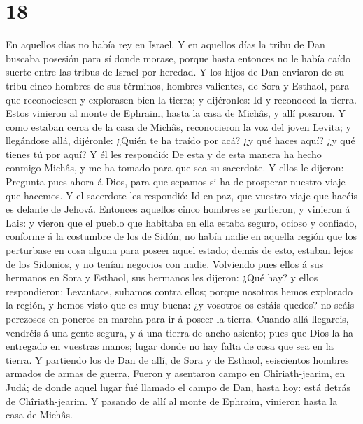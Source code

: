\hypertarget{section-17}{%
\section{18}\label{section-17}}

 En aquellos días no había rey en Israel. Y en aquellos
días la tribu de Dan buscaba posesión para sí donde morase, porque hasta
entonces no le había caído suerte entre las tribus de Israel por
heredad.  Y los hijos de Dan enviaron de su tribu cinco
hombres de sus términos, hombres valientes, de Sora y Esthaol, para que
reconociesen y explorasen bien la tierra; y dijéronles: Id y reconoced
la tierra. Estos vinieron al monte de Ephraim, hasta la casa de Michâs,
y allí posaron.  Y como estaban cerca de la casa de
Michâs, reconocieron la voz del joven Levita; y llegándose allá,
dijéronle: ¿Quién te ha traído por acá? ¿y qué haces aquí? ¿y qué tienes
tú por aquí?  Y él les respondió: De esta y de esta manera
ha hecho conmigo Michâs, y me ha tomado para que sea su sacerdote.
 Y ellos le dijeron: Pregunta pues ahora á Dios, para que
sepamos si ha de prosperar nuestro viaje que hacemos.  Y
el sacerdote les respondió: Id en paz, que vuestro viaje que hacéis es
delante de Jehová.  Entonces aquellos cinco hombres se
partieron, y vinieron á Lais: y vieron que el pueblo que habitaba en
ella estaba seguro, ocioso y confiado, conforme á la costumbre de los de
Sidón; no había nadie en aquella región que los perturbase en cosa
alguna para poseer aquel estado; demás de esto, estaban lejos de los
Sidonios, y no tenían negocios con nadie.  Volviendo pues
ellos á sus hermanos en Sora y Esthaol, sus hermanos les dijeron: ¿Qué
hay? y ellos respondieron:  Levantaos, subamos contra
ellos; porque nosotros hemos explorado la región, y hemos visto que es
muy buena: ¿y vosotros os estáis quedos? no seáis perezosos en poneros
en marcha para ir á poseer la tierra.  Cuando allá
llegareis, vendréis á una gente segura, y á una tierra de ancho asiento;
pues que Dios la ha entregado en vuestras manos; lugar donde no hay
falta de cosa que sea en la tierra.  Y partiendo los de
Dan de allí, de Sora y de Esthaol, seiscientos hombres armados de armas
de guerra,  Fueron y asentaron campo en Chîriath-jearim,
en Judá; de donde aquel lugar fué llamado el campo de Dan, hasta hoy:
está detrás de Chîriath-jearim.  Y pasando de allí al
monte de Ephraim, vinieron hasta la casa de Michâs. 
